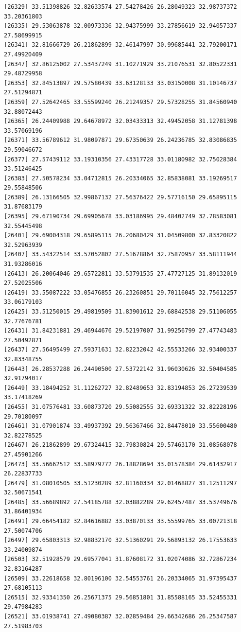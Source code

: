 \documentclass[
  letterpaper,
  DIV=11,
  numbers=noendperiod]{scrartcl}
\begin{document}
\begin{verbatim}
[26329] 33.51398826 32.82633574 27.54278426 26.28049323 32.98737372 33.20361803
[26335] 29.53063878 32.00973336 32.94375999 33.27856619 32.94057337 27.58699915
[26341] 32.81666729 26.21862899 32.46147997 30.99685441 32.79200171 27.49920409
[26347] 32.86125002 27.53437249 31.10271929 33.21076531 32.80522331 29.48729958
[26353] 32.84513897 29.57580439 33.63128133 33.03150008 31.10146737 27.51294871
[26359] 27.52642465 33.55599240 26.21249357 29.57328255 31.84560940 32.88072443
[26365] 26.24409988 29.64678972 32.03433313 32.49452058 31.12781398 33.57069196
[26371] 33.56789612 31.98097871 29.67350639 26.24236785 32.83086835 29.59046672
[26377] 27.57439112 33.19310356 27.43317728 33.01180982 32.75028384 33.51246425
[26383] 27.50578234 33.04712815 26.20334065 32.85838081 33.19269517 29.55848506
[26389] 26.13166505 32.99867132 27.56376422 29.57716150 29.65895115 31.87683179
[26395] 29.67190734 29.69905678 33.03186995 29.48402749 32.78583081 32.55445498
[26401] 29.69004318 29.65895115 26.20680429 31.04509800 32.83320822 32.52963939
[26407] 33.54322514 33.57052802 27.51678864 32.75870957 33.58111944 31.93286016
[26413] 26.20064046 29.65722811 33.53791535 27.47727125 31.89132019 27.52025506
[26419] 33.55087222 33.05476855 26.23260851 29.70116045 32.75612257 33.06179103
[26425] 33.51250015 29.49819509 31.83901612 29.68842538 29.51106055 32.77676781
[26431] 31.84231881 29.46944676 29.52197007 31.99256799 27.47743483 27.50492871
[26437] 27.56495499 27.59371631 32.82232042 42.55533266 32.93400337 32.83348755
[26443] 26.28537288 26.24490500 27.53722142 31.96030626 32.50404585 32.91794017
[26449] 33.18494252 31.11262727 32.82489653 32.83194853 26.27239539 33.17418269
[26455] 31.07576481 33.60873720 29.55082555 32.69331322 32.82228196 29.70180097
[26461] 31.07901874 33.49937392 29.56367466 32.84478010 33.55600480 32.82278525
[26467] 26.21862899 29.67324415 32.79830824 29.57463170 31.08568078 27.45901266
[26473] 33.56662512 33.58979772 26.18828694 33.01578384 29.61432917 26.22837733
[26479] 31.08010505 33.51230289 32.81160334 32.01468827 31.12511297 32.50671541
[26485] 33.56689892 27.54185788 32.03882289 29.62457487 33.53749676 31.86401934
[26491] 29.66454182 32.84616882 33.03870133 33.55599765 33.00721318 27.50074706
[26497] 29.65803313 32.98832170 32.51360291 29.56893132 26.17553633 33.24009874
[26503] 32.51928579 29.69577041 31.87608172 31.02074086 32.72867234 32.83164287
[26509] 33.22618658 32.80196100 32.54553761 26.20334065 31.97395437 27.68105113
[26515] 32.93341350 26.25671375 29.56851801 31.85588165 33.52455331 29.47984283
[26521] 33.01938741 27.49080387 32.02859484 29.66342686 26.25347587 27.51983703

\end{verbatim}
\end{document}
